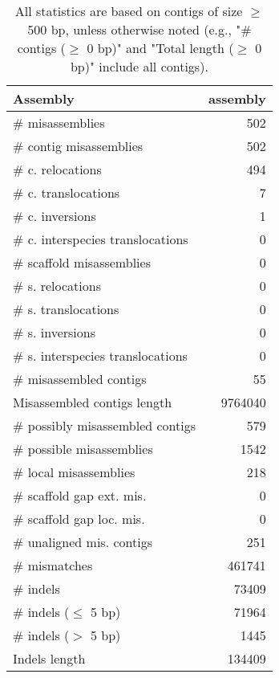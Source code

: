 \documentclass[12pt,a4paper]{article}
\begin{document}
\begin{table}[ht]
\begin{center}
\caption{All statistics are based on contigs of size $\geq$ 500 bp, unless otherwise noted (e.g., "\# contigs ($\geq$ 0 bp)" and "Total length ($\geq$ 0 bp)" include all contigs).}
\begin{tabular}{|l*{1}{|r}|}
\hline
Assembly & assembly \\ \hline
\# misassemblies & 502 \\ \hline
\hspace{2mm}\# contig misassemblies & 502 \\ \hline
\hspace{5mm}\# c. relocations & 494 \\ \hline
\hspace{5mm}\# c. translocations & 7 \\ \hline
\hspace{5mm}\# c. inversions & 1 \\ \hline
\hspace{5mm}\# c. interspecies translocations & 0 \\ \hline
\hspace{2mm}\# scaffold misassemblies & 0 \\ \hline
\hspace{5mm}\# s. relocations & 0 \\ \hline
\hspace{5mm}\# s. translocations & 0 \\ \hline
\hspace{5mm}\# s. inversions & 0 \\ \hline
\hspace{5mm}\# s. interspecies translocations & 0 \\ \hline
\# misassembled contigs & 55 \\ \hline
Misassembled contigs length & 9764040 \\ \hline
\# possibly misassembled contigs & 579 \\ \hline
\hspace{5mm}\# possible misassemblies & 1542 \\ \hline
\# local misassemblies & 218 \\ \hline
\# scaffold gap ext. mis. & 0 \\ \hline
\# scaffold gap loc. mis. & 0 \\ \hline
\# unaligned mis. contigs & 251 \\ \hline
\# mismatches & 461741 \\ \hline
\# indels & 73409 \\ \hline
\hspace{5mm}\# indels ($\leq$ 5 bp) & 71964 \\ \hline
\hspace{5mm}\# indels ($>$ 5 bp) & 1445 \\ \hline
Indels length & 134409 \\ \hline
\end{tabular}
\end{center}
\end{table}
\end{document}
